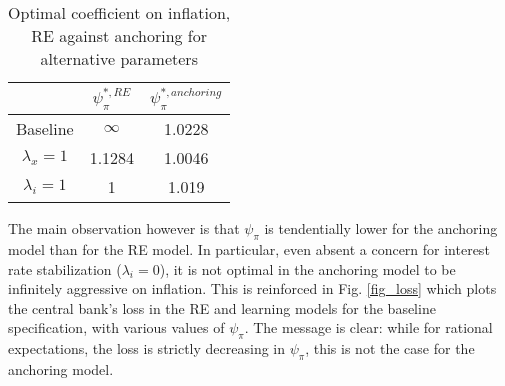 \documentclass[11pt]{article}
\renewcommand{\[}{\begin{equation}}
\renewcommand{\]}{\end{equation}}
\begin{document}
\begin{center}
\begin{table}[h!]
\begin{tabular}{ c | c | c }
 & $\psi^{*,RE}_{\pi}$ & $\psi^{*,anchoring}_{\pi}$  \\  \hline
  Baseline  & $\infty$  & 1.0228 \\  \hline
 $\lambda_x =1 $ & 1.1284  & 1.0046 \\  \hline
 $\lambda_i =1 $ &  1  & 1.019 \\  \hline
\end{tabular}     
      \caption{Optimal coefficient on inflation, RE against anchoring for alternative parameters}  \label{par_opt}
 \end{table}
\end{center}


\vspace{-0.8cm}

The main observation however is that $\psi_{\pi}$ is tendentially lower for the anchoring model than for the RE model. In particular, even absent a concern for interest rate stabilization ($\lambda_i = 0$), it is not optimal in the anchoring model to be infinitely aggressive on inflation. This is reinforced in Fig. \ref{fig_loss} which plots the central bank's loss in the RE and learning models for the baseline specification, with various values of $\psi_{\pi}$. The message is clear: while for rational expectations, the loss is strictly decreasing in $\psi_{\pi}$, this is not the case for the anchoring model. 
\end{document}

